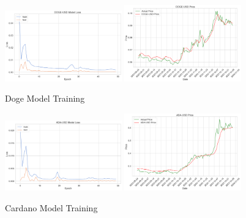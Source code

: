 \documentclass{ledger}
\begin{document}
\begin{figure}[htbp]
    \centering
    \includegraphics[width=0.45\textwidth]{code/price-prediction/lstm/images/doge_usd_loss.png} %
    \hspace{0.05\textwidth} %
    \includegraphics[width=0.45\textwidth]{code/price-prediction/lstm/images/doge_usd_price.png} %
    \caption{Doge Model Training}
    \label{fig:side_by_side}
\end{figure}

\begin{figure}[htbp]
    \centering
    \includegraphics[width=0.45\textwidth]{code/price-prediction/lstm/images/ada_usd_loss.png} %
    \hspace{0.05\textwidth} %
    \includegraphics[width=0.45\textwidth]{code/price-prediction/lstm/images/ada_usd_price.png} %
    \caption{Cardano Model Training}
    \label{fig:side_by_side}
\end{figure}
\end{document}
